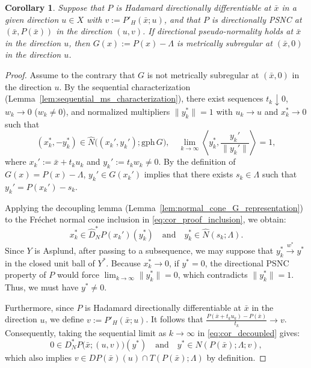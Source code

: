 \documentclass[12pt,twoside,reqno]{amsart}
\newtheorem{corollary}[theorem]{Corollary}
\theoremstyle{definition}
\numberwithin{equation}{section}
\begin{document}
\begin{corollary} \label{cor:dpn_to_mscq}
    Suppose that $P$ is Hadamard directionally differentiable at $\bar{x}$ in a given direction $u \in X$ with $v:=P'_H(\bar{x};u)$, and that $P$ is directionally PSNC at $(\bar{x},P(\bar{x}))$ in the direction $(u,v)$. If directional pseudo-normality holds at $\bar{x}$ in the direction $u$, then $G(x) := P(x) - \Lambda$ is metrically subregular at $(\bar{x}, 0)$ in the direction $u$. 
\end{corollary}

\begin{proof}
    Assume to the contrary that $G$ is not metrically subregular at $(\bar{x}, 0)$ in the direction $u$. By the sequential characterization (Lemma~\ref{lem:sequential_ms_characterization}), there exist sequences $t_k \downarrow 0$, $w_k \to 0$ ($w_k \neq 0$), and normalized multipliers $\|y_k^*\| = 1$ with $u_k \to u$ and $x_k^* \to 0$ such that
    \begin{equation} \label{eq:cor_proof_inclusion}
        (x_k^*, -y_k^*) \in \widehat{N}\big((x_k', y_k'); \mathrm{gph}\, G\big), \quad \lim_{k\to \infty} \left\langle y_k^*, \frac{y_k'}{\|y_k'\|} \right\rangle = 1,
    \end{equation}
    where $x_k' := \bar{x} + t_k u_k$ and $y_k' := t_k w_k \neq 0$. By the definition of $G(x) = P(x) - \Lambda$, $y_k' \in G(x_k')$ implies that there exists $s_k \in \Lambda$ such that $y_k' = P(x_k') - s_k$.

    Applying the decoupling lemma (Lemma~\ref{lem:normal_cone_G_representation}) to the Fr\'echet normal cone inclusion in \eqref{eq:cor_proof_inclusion}, we obtain:
    \begin{equation} \label{eq:cor_decoupled}
        x_k^* \in \widehat{D}_N^* P(x_k')(y_k^*) \quad \text{and} \quad y_k^* \in \widehat{N}(s_k; \Lambda).
    \end{equation}
    Since $Y$ is Asplund, after passing to a subsequence, we may suppose that $y_k^* \xrightarrow{w^*} y^*$ in the closed unit ball of $Y^*$. Because $x_k^* \to 0$, if $y^* = 0$, the directional PSNC property of $P$ would force $\lim_{k \to \infty} \|y_k^*\| = 0$, which contradicts $\|y_k^*\| = 1$. Thus, we must have $y^* \neq 0$. 

    Furthermore, since $P$ is Hadamard directionally differentiable at $\bar{x}$ in the direction $u$, we define $v := P'_H(\bar{x}; u)$. It follows that $\frac{P(\bar{x} + t_k u_k) - P(\bar{x})}{t_k} \to v$. Consequently, taking the sequential limit as $k \to \infty$ in \eqref{eq:cor_decoupled} gives:
    \begin{equation*}
        0 \in D_N^* P\big(\bar{x}; (u, v)\big)(y^*) \quad \text{and} \quad y^* \in N(P(\bar{x}); \Lambda; v),
    \end{equation*}
    which also implies $v \in DP(\bar{x})(u) \cap T(P(\bar{x}); \Lambda)$ by definition.


\end{proof}
\end{document}
